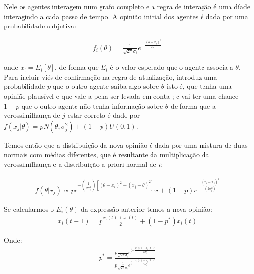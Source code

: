 Nele os agentes interagem num grafo completo e a regra de interação é uma díade
interagindo a cada passo de tempo. A opinião inicial dos agentes é dada por uma
probabilidade subjetiva:


\begin{align}
f_i(\theta) = \frac{1}{\sqrt{2 \pi} \sigma_i} e^{-
  \frac{(\theta - x_i )^2}{2 \sigma_i}}
  \end{align}

  onde \(x_i = E_i[\theta] \), de forma que \(E_i\) é o valor esperado que o agente
  associa a \(\theta\). Para incluir viés de confirmação na regra de atualização,
   introduz uma probabilidade \(p\) que o outro
  agente saiba algo sobre $\theta$ isto é, que tenha uma opinião plausível e que vale
  a pena ser levada em conta ; e vai ter uma chance \(1 - p\) que o outro agente
  não tenha informação sobre $\theta$ de forma que a verossimilhança de $j$ estar
  correto é dado por $ f(x_j|\theta) = p N(\theta,\sigma_j^2) + (1-p)U(0,1)$.

  Temos então que a distribuição da nova opinião é dada por uma mistura de duas
  normais com médias diferentes, que é resultante da multiplicação da
  verossimilhança e a distribuição a priori normal de $i$:
  
  \begin{align}
    f(\theta | x_j)
    \propto 
    p
    e^
    {-(\frac{1}{2\sigma_i^2})
    [(\theta - x_i)^2
    +
    (x_j - \theta )^2
    ]}x
    +
    (1-p)
    e^{-\frac{(x_i - x_j)^2}{(2 \sigma_i^2)}}
  \end{align}

 Se calcularmos o $E_i(\theta)$ da expressão anterior temos a nova opinião:
  \begin{align}
    x_i(t+1)
    =
    p
    \frac{x_i(t) + x_j(t)}{2}
    +
    (1-p^*)x_i(t)
  \end{align}

  Onde:
  \begin{align}
    p^*
    =
    \frac{
      p \frac{1}{\sqrt{2 \pi} \sigma_i}
      e^{(- \frac{x_i (t) - x_j (t))^2}{2 \sigma_i^2}}
    }{
      p
      \frac{1}{\sqrt{2 \pi} \sigma_i}
      e^{(- \frac{x_i (t) - x_j (t))^2}{2 \sigma_i^2}}
    }
  \end{align}

